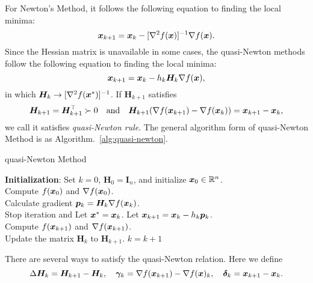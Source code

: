 For Newton's Method, it follows the following equation to finding the local minima:
\[
    \bm{x}_{k+1} = \bm{x}_k - [\nabla^2 f(\bm{x})]^{-1} \nabla f(\bm{x}).  
\]
Since the Hessian matrix is unavailable in some cases, the quasi-Newton methods follow the following equation to finding the local minima:
\[
    \bm{x}_{k+1} = \bm{x}_k - h_k \bm{H}_k \nabla f(\bm{x}),
\]
in which \(\bm{H}_k \to [\nabla^2 f(\bm{x}^*)]^{-1}\). If \(\bm{H}_{k+1}\) satisfies
\[
    \bm{H}_{k+1} = \bm{H}_{k+1}^\top \succ 0 \quad \text{and} \quad 
    \bm{H}_{k+1}(\nabla f(\bm{x}_{k+1}) - \nabla f(\bm{x}_{k})) = \bm{x}_{k+1} - \bm{x}_k,
\]
we call it satisfies \emph{quasi-Newton rule}. The general algorithm form of quasi-Newton Method is as Algorithm.~\ref{alg:quasi-newton}.

\begin{algorithm}[!htbp]
    \caption{quasi-Newton Method}\label{alg:quasi-newton}
    \textbf{Initialization}: Set \(k = 0\), \(\bm{H}_0 = \bm{I}_n\), and initialize \(\bm{x}_0 \in \mathbb{R}^n\). \\
    Compute \(f(\bm{x}_0)\) and \(\nabla f(\bm{x}_0)\).\\
     {
        Calculate gradient \(\bm{p}_k = \bm{H}_k \nabla f(\bm{x}_k)\).\\
         {
            Stop iteration and Let \(\bm{x}^* = \bm{x}_k\).
        }{
            Let \(\bm{x}_{k+1} = \bm{x}_k - h_k \bm{p}_k\). \\
            Compute \(f(\bm{x}_{k+1})\) and \(\nabla f(\bm{x}_{k+1})\). \\
            Update the matrix \(\bm{H}_k\) to \(\bm{H}_{k+1}\).
        }
        \(k = k+1\)
    }
\end{algorithm}

There are several ways to satisfy the quasi-Newton relation. Here we define 
\[
    \Delta \bm{H}_k = \bm{H}_{k+1} - \bm{H}_k, \quad \bm{\gamma}_k = \nabla f(\bm{x}_{k+1}) - \nabla f(\bm{x})_k, \quad \bm{\delta}_k = \bm{x}_{k+1} - \bm{x}_k.  
\]


